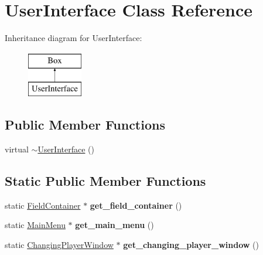 \hypertarget{classUserInterface}{}\section{User\+Interface Class Reference}
\label{classUserInterface}
Inheritance diagram for User\+Interface\+:\begin{figure}[H]
\begin{center}
\leavevmode
\includegraphics[height=2.000000cm]{classUserInterface}
\end{center}
\end{figure}
\subsection*{Public Member Functions}
\begin{DoxyCompactItemize}
\item 
virtual \mbox{\hyperlink{classUserInterface_a7b1a866c59dbeabdd3f9ae639bc88fad}{$\sim$\+User\+Interface}} ()
\end{DoxyCompactItemize}
\subsection*{Static Public Member Functions}
\begin{DoxyCompactItemize}
\item 
\mbox{\label{classUserInterface_a6913344123da23edeee9aa911942db18}} 
static \mbox{\hyperlink{classFieldContainer}{Field\+Container}} $\ast$ {\bfseries get\+\_\+field\+\_\+container} ()
\item 
\mbox{\label{classUserInterface_a4bb8df401cd57b8698010c65eb2231d3}} 
static \mbox{\hyperlink{classMainMenu}{Main\+Menu}} $\ast$ {\bfseries get\+\_\+main\+\_\+menu} ()
\item 
\mbox{\label{classUserInterface_a9f88fb56b6a1ca9f22fe6726fad7ff88}} 
static \mbox{\hyperlink{classChangingPlayerWindow}{Changing\+Player\+Window}} $\ast$ {\bfseries get\+\_\+changing\+\_\+player\+\_\+window} ()
\end{DoxyCompactItemize}
